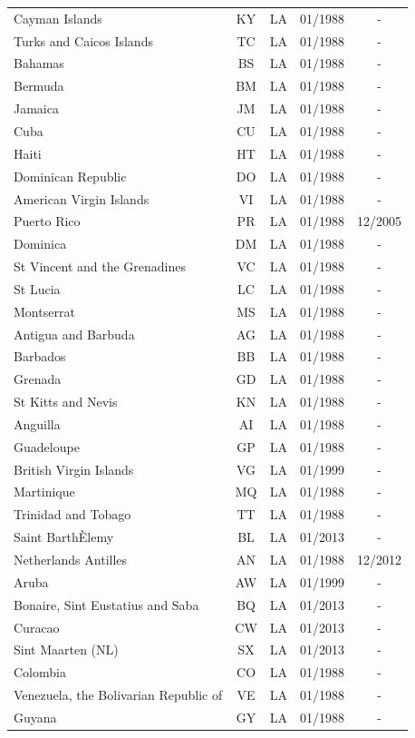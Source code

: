 \begin{small}
\begin{longtable}{p{7.5cm}cccc}
Cayman Islands	&	KY	&	LA	&	01/1988	&	-	\\
Turks and Caicos Islands	&	TC	&	LA	&	01/1988	&	-	\\
Bahamas	&	BS	&	LA	&	01/1988	&	-	\\
Bermuda	&	BM	&	LA	&	01/1988	&	-	\\
Jamaica	&	JM	&	LA	&	01/1988	&	-	\\
Cuba	&	CU	&	LA	&	01/1988	&	-	\\
Haiti	&	HT	&	LA	&	01/1988	&	-	\\
Dominican Republic	&	DO	&	LA	&	01/1988	&	-	\\
American Virgin Islands	&	VI	&	LA	&	01/1988	&	-	\\
Puerto Rico	&	PR	&	LA	&	01/1988	&	12/2005	\\
Dominica	&	DM	&	LA	&	01/1988	&	-	\\
St Vincent and the Grenadines	&	VC	&	LA	&	01/1988	&	-	\\
St Lucia	&	LC	&	LA	&	01/1988	&	-	\\
Montserrat	&	MS	&	LA	&	01/1988	&	-	\\
Antigua and Barbuda	&	AG	&	LA	&	01/1988	&	-	\\
Barbados	&	BB	&	LA	&	01/1988	&	-	\\
Grenada	&	GD	&	LA	&	01/1988	&	-	\\
St Kitts and Nevis	&	KN	&	LA	&	01/1988	&	-	\\
Anguilla	&	AI	&	LA	&	01/1988	&	-	\\
Guadeloupe	&	GP	&	LA	&	01/1988	&	-	\\
British Virgin Islands	&	VG	&	LA	&	01/1999	&	-	\\
Martinique	&	MQ	&	LA	&	01/1988	&	-	\\
Trinidad and Tobago	&	TT	&	LA	&	01/1988	&	-	\\
Saint BarthÈlemy	&	BL	&	LA	&	01/2013	&	-	\\
Netherlands Antilles	&	AN	&	LA	&	01/1988	&	12/2012	\\
Aruba	&	AW	&	LA	&	01/1999	&	-	\\
Bonaire, Sint Eustatius and Saba	&	BQ	&	LA	&	01/2013	&	-	\\
Curacao	&	CW	&	LA	&	01/2013	&	-	\\
Sint Maarten (NL)	&	SX	&	LA	&	01/2013	&	-	\\
Colombia	&	CO	&	LA	&	01/1988	&	-	\\
Venezuela, the Bolivarian Republic of	&	VE	&	LA	&	01/1988	&	-	\\
Guyana	&	GY	&	LA	&	01/1988	&	-	\\

\end{longtable}
\end{small}
